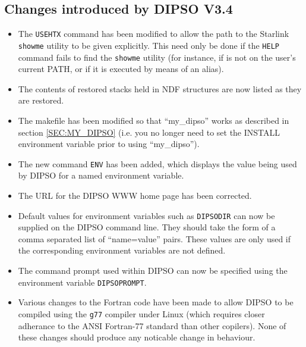 \documentclass[twoside,11pt,noabs,nolof]{starlink}
\begin{document}
\subsection{Changes introduced by DIPSO V3.4}
\begin{itemize}

\item The \texttt{USEHTX} command has been modified to allow the path to the
Starlink \texttt{showme} utility to be given explicitly. This need only be done
if the \texttt{HELP} command fails to find the \texttt{showme} utility (for
instance, if is not on the user's current PATH, or if it is
executed by means of an alias).

\item The contents of restored stacks held in NDF structures are now
listed as they are restored.

\item The makefile has been modified so that ``my\_dipso'' works as
described in section \ref{SEC:MY_DIPSO} (i.e. you no longer need to
set the INSTALL environment variable prior to using ``my\_dipso'').

\item The new command \texttt{ENV} has been added, which displays the value
being used by DIPSO for a named environment variable.

\item The URL for the DIPSO WWW home page has been corrected.

\item Default values for environment variables such as \verb+DIPSODIR+ can
now be supplied on the DIPSO command line. They should take the form of a
comma separated list of ``name=value'' pairs. These values are only used
if the corresponding environment variables are not defined.

\item The command prompt used within DIPSO can now be specified using the
environment variable \verb+DIPSOPROMPT+.

\item Various changes to the Fortran code have been made to allow DIPSO
to be compiled using the \verb+g77+ compiler under Linux (which requires
closer adherance to the ANSI Fortran-77 standard than other copilers).
None of these changes should produce any noticable change in behaviour.

\end{itemize}
\end{document}
